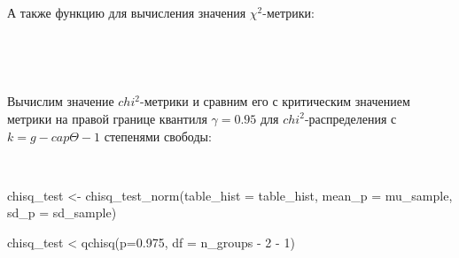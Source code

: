 \documentclass[
  14,
]{article}
\newenvironment{Shaded}{\begin{snugshade}}{\end{snugshade}}
\newcommand{\AttributeTok}[1]{\textcolor[rgb]{0.77,0.63,0.00}{#1}}
\newcommand{\ControlFlowTok}[1]{\textcolor[rgb]{0.13,0.29,0.53}{\textbf{#1}}}
\newcommand{\DecValTok}[1]{\textcolor[rgb]{0.00,0.00,0.81}{#1}}
\newcommand{\FloatTok}[1]{\textcolor[rgb]{0.00,0.00,0.81}{#1}}
\newcommand{\FunctionTok}[1]{\textcolor[rgb]{0.00,0.00,0.00}{#1}}
\newcommand{\NormalTok}[1]{#1}
\newcommand{\OtherTok}[1]{\textcolor[rgb]{0.56,0.35,0.01}{#1}}
\newcommand{\SpecialCharTok}[1]{\textcolor[rgb]{0.00,0.00,0.00}{#1}}
\begin{document}
\(\ \)

А также функцию для вычисления значения \(\chi^2\)-метрики:

\(\ \)

\begin{Shaded}
\end{Shaded}

\(\ \)

Вычислим значение \(chi^2\)-метрики и сравним его с критическим
значением метрики на правой границе квантиля \(\gamma = 0.95\) для
\(chi^2\)-распределения с \(k = g - cap\Theta - 1\) степенями свободы:

\(\ \)

\begin{Shaded}
\begin{Highlighting}[]
\NormalTok{chisq\_test }\OtherTok{\textless{}{-}} \FunctionTok{chisq\_test\_norm}\NormalTok{(}\AttributeTok{table\_hist =}\NormalTok{ table\_hist, }
                              \AttributeTok{mean\_p =}\NormalTok{ mu\_sample, }
                              \AttributeTok{sd\_p =}\NormalTok{ sd\_sample)}

\NormalTok{chisq\_test }\SpecialCharTok{\textless{}} \FunctionTok{qchisq}\NormalTok{(}\AttributeTok{p=}\FloatTok{0.975}\NormalTok{, }\AttributeTok{df =}\NormalTok{ n\_groups }\SpecialCharTok{{-}} \DecValTok{2} \SpecialCharTok{{-}} \DecValTok{1}\NormalTok{)}
\end{Highlighting}
\end{Shaded}
\end{document}
